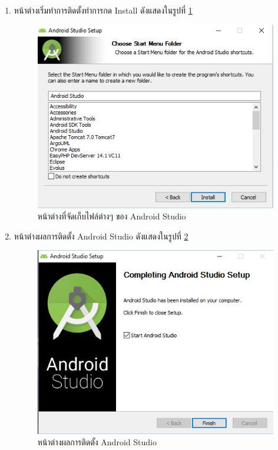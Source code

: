 \begin{enumerate}
	\item  หน้าต่างเริ่มทำการติดตั้งทำการกด Install ดังแสดงในรูปที่ \ref{Fig:android6}
	\begin{figure}[H]
		\centering
		\includegraphics[width=0.7\columnwidth]{Figures/prepareation/android6}
		\caption{หน้าต่างที่จัดเก็บไฟล์ต่างๆ ของ  Android Studio}
		\label{Fig:android6}
	\end{figure}
	
	\item  หน้าต่างผลการติดตั้ง Android Studio ดังแสดงในรูปที่ \ref{Fig:android7}
	\begin{figure}[H]
		\centering
		\includegraphics[width=0.7\columnwidth]{Figures/prepareation/android7}
		\caption{ หน้าต่างผลการติดตั้ง Android Studio}
		\label{Fig:android7}
	\end{figure}
	
\end{enumerate}

\newpage

